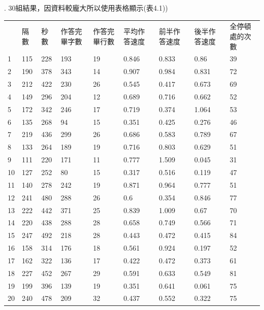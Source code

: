 . 30組結果，因資料較龐大所以使用表格顯示(表4.1))\\
\begin{table}[]
	\label{table1}
	\begin{tabular}{lllllllll}
		& 隔數  & 秒數  & 作答完畢字數 & 作答完畢行數 & 平均作答速度 & 前半作答速度 & 後半作答速度 & 全停頓處的次數 \\
		1  & 115 & 228 & 193    & 19     & 0.846  & 0.833  & 0.86   & 39      \\
		2  & 190 & 378 & 343    & 14     & 0.907  & 0.984  & 0.831  & 72      \\
		3  & 212 & 422 & 230    & 26     & 0.545  & 0.417  & 0.673  & 69      \\
		4  & 149 & 296 & 204    & 12     & 0.689  & 0.716  & 0.662  & 52      \\
		5  & 172 & 342 & 246    & 17     & 0.719  & 0.374  & 1.064  & 53      \\
		6  & 135 & 268 & 94     & 15     & 0.351  & 0.425  & 0.276  & 46      \\
		7  & 219 & 436 & 299    & 26     & 0.686  & 0.583  & 0.789  & 67      \\
		8  & 133 & 264 & 189    & 19     & 0.716  & 0.803  & 0.629  & 51      \\
		9  & 111 & 220 & 171    & 11     & 0.777  & 1.509  & 0.045  & 31      \\
		10 & 127 & 252 & 80     & 15     & 0.317  & 0.516  & 0.119  & 47      \\
		11 & 140 & 278 & 242    & 19     & 0.871  & 0.964  & 0.777  & 51      \\
		12 & 241 & 480 & 288    & 26     & 0.6    & 0.354  & 0.846  & 77      \\
		13 & 222 & 442 & 371    & 25     & 0.839  & 1.009  & 0.67   & 70      \\
		14 & 220 & 438 & 288    & 28     & 0.658  & 0.749  & 0.566  & 71      \\
		15 & 247 & 492 & 218    & 28     & 0.443  & 0.472  & 0.415  & 84      \\
		16 & 158 & 314 & 176    & 18     & 0.561  & 0.924  & 0.197  & 52      \\
		17 & 162 & 322 & 136    & 17     & 0.422  & 0.472  & 0.373  & 61      \\
		18 & 227 & 452 & 267    & 29     & 0.591  & 0.633  & 0.549  & 81      \\
		19 & 199 & 396 & 139    & 19     & 0.351  & 0.641  & 0.061  & 75      \\
		20 & 240 & 478 & 209    & 32     & 0.437  & 0.552  & 0.322  & 75      \\

\end{tabular}
\end{table}
